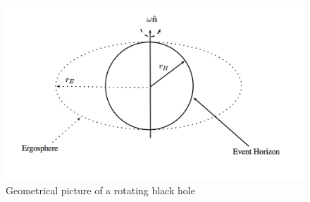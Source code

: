 \documentclass[11pt, a4paper,oneside,openright]{book}
\numberwithin{equation}{section}
\begin{document}
\begin{figure}
\includegraphics{Draw/kerrBH.png}
\caption{Geometrical picture of a rotating black hole}
\label{kerrBH}
\end{figure} 
\end{document}
